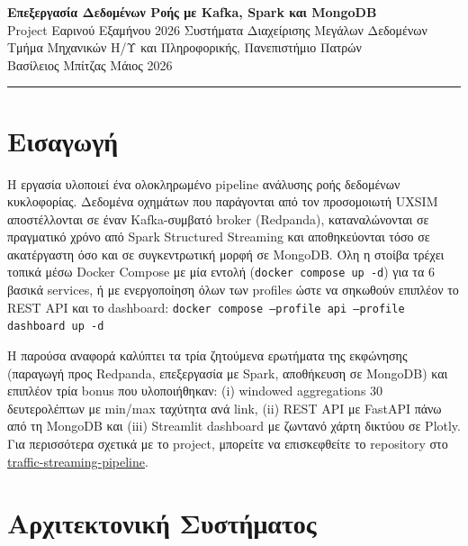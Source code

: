 \documentclass[11pt,a4paper]{article}
\newcommand{\code}[1]{\texttt{\small #1}}
\begin{document}
\begin{center}
   {\Large\bfseries Επεξεργασία Δεδομένων Ροής με Kafka, Spark και MongoDB}\\[4pt]
   {\small Project Εαρινού Εξαμήνου 2026 \textbar{} Συστήματα Διαχείρισης Μεγάλων Δεδομένων}\\[2pt]
   {\small Τμήμα Μηχανικών Η/Υ και Πληροφορικής, Πανεπιστήμιο Πατρών}\\[2pt]
   {\small Βασίλειος Μπίτζας \textbar{} Μάιος 2026}
\end{center}
\vspace{3pt}\hrule\vspace{6pt}

\section{Εισαγωγή}
Η εργασία υλοποιεί ένα ολοκληρωμένο pipeline ανάλυσης ροής δεδομένων κυκλοφορίας. Δεδομένα οχημάτων που παράγονται από τον προσομοιωτή UXSIM αποστέλλονται σε έναν Kafka-συμβατό broker (Redpanda), καταναλώνονται σε πραγματικό χρόνο από Spark Structured Streaming και αποθηκεύονται τόσο σε ακατέργαστη όσο και σε συγκεντρωτική μορφή σε MongoDB. Όλη η στοίβα τρέχει τοπικά μέσω Docker Compose με μία εντολή (\code{docker compose up -d}) για τα 6 βασικά services, ή με ενεργοποίηση όλων των profiles ώστε να σηκωθούν επιπλέον το REST API και το dashboard: \newline\code{docker compose --profile api --profile dashboard up -d}

Η παρούσα αναφορά καλύπτει τα τρία ζητούμενα ερωτήματα της εκφώνησης (παραγωγή προς Redpanda, επεξεργασία με Spark, αποθήκευση σε MongoDB) και επιπλέον τρία bonus που υλοποιήθηκαν: (i) windowed aggregations 30 δευτερολέπτων με min/max ταχύτητα ανά link, (ii) REST API με FastAPI πάνω από τη MongoDB και (iii) Streamlit dashboard με ζωντανό χάρτη δικτύου σε Plotly. Για περισσότερα σχετικά με το project, μπορείτε να επισκεφθείτε το repository στο \href{https://github.com/vasilisbit/traffic-streaming-pipeline}{traffic-streaming-pipeline}.

\section{Αρχιτεκτονική Συστήματος}
\end{document}
